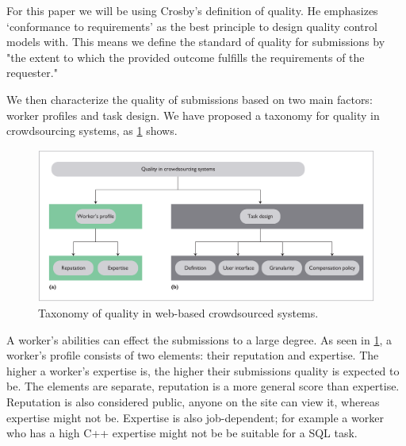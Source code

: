 \documentclass[9pt,twocolumn]{article}
\begin{document}
	For this paper we will be using Crosby's definition of quality. \cite{crosby1996quality} He emphasizes `conformance to requirements' as the best principle to design quality control models with. This means we define the standard of quality for submissions by \\
	"the extent to which the provided outcome fulfills the requirements of the requester."
	
	We then characterize the quality of submissions based on two main factors: worker profiles and task design. We have proposed a taxonomy for quality in crowdsourcing systems, as \cref{fig-taxonomy} shows.
	
	\begin{figure}[h]
		\includegraphics[width=\textwidth]{taxonomy}
		\caption{Taxonomy of quality in web-based crowdsourced systems.}
		\label{fig-taxonomy}
	\end{figure}
	
	A worker's abilities can effect the submissions to a large degree. \cite{khazankin2012predicting} As seen in \cref{fig-taxonomy}, a worker's profile consists of two elements: their reputation and expertise. The higher a worker's expertise is, the higher their submissions quality is expected to be. The elements are separate, reputation is a more general score than expertise. Reputation is also considered public, anyone on the site can view it, whereas expertise might not be. Expertise is also job-dependent; for example a worker who has a high C++ expertise might not be be suitable for a SQL task. 
	
\end{document}
